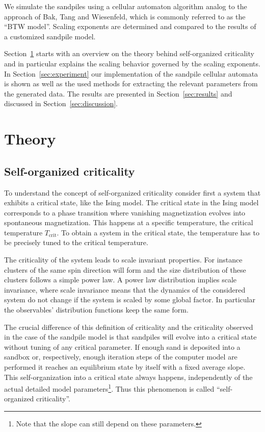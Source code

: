 We simulate the sandpiles using a cellular automaton algorithm analog to the approach of Bak, Tang and Wiesenfeld,
which is commonly referred to as the \enquote{BTW model}. Scaling exponents are determined and compared to the
results of a customized sandpile model.

Section~\ref{sec:theory} starts with an overview on the theory behind self-organized criticality and in particular
explains the scaling behavior governed by the scaling exponents.
In Section~\ref{sec:experiment} our implementation of the sandpile cellular automata is shown as well as
the used methods for extracting the relevant parameters from the generated data.
The results are presented in Section~\ref{sec:results} and discussed in Section~\ref{sec:discussion}.


\section{Theory}
\label{sec:theory}

\subsection{Self-organized criticality}
\label{sec:th:SOC}
To understand the concept of self-organized criticality consider first a system that exhibits a critical state,
like the Ising model. The critical state in the Ising model corresponds to a phase transition where vanishing
magnetization evolves into spontaneous magnetization. This happens at a specific temperature, the critical temperature
$T_{\mathrm{crit}}$. To obtain a system in the critical state, the temperature has to be precisely tuned to the critical
temperature.

The criticality of the system leads to scale invariant properties. For instance clusters of the same spin direction
will form and the size distribution of these clusters follows a simple power law. A power law distribution implies
scale invariance, where scale invariance means that the dynamics of the considered system do not change if the system
is scaled by some global factor. In particular the observables' distribution functions keep the same form.

The crucial difference of this definition of criticality and the criticality observed in the case of the sandpile model
is that sandpiles will evolve into a critical state without tuning of any critical parameter.
If enough sand is deposited into a sandbox or, respectively, enough iteration steps of the computer model are performed
it reaches an equilibrium state by itself with a fixed average slope. This self-organization into a critical state
always happens, independently of the actual detailed model parameters\footnote{Note that the slope can still depend
on these parameters.}. Thus this phenomenon is called \enquote{self-organized criticality}.

